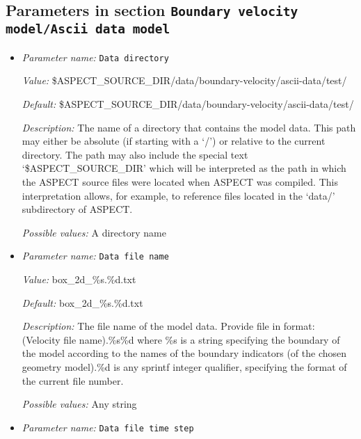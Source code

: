 \subsection{Parameters in section \tt Boundary velocity model/Ascii data model}
\label{parameters:Boundary_20velocity_20model/Ascii_20data_20model}

\begin{itemize}
\item {\it Parameter name:} {\tt Data directory}
\label{parameters:Boundary velocity model/Ascii data model/Data directory}


{\it Value:} \$ASPECT\_SOURCE\_DIR/data/boundary-velocity/ascii-data/test/


{\it Default:} \$ASPECT\_SOURCE\_DIR/data/boundary-velocity/ascii-data/test/


{\it Description:} The name of a directory that contains the model data. This path may either be absolute (if starting with a `/') or relative to the current directory. The path may also include the special text `\$ASPECT\_SOURCE\_DIR' which will be interpreted as the path in which the ASPECT source files were located when ASPECT was compiled. This interpretation allows, for example, to reference files located in the `data/' subdirectory of ASPECT. 


{\it Possible values:} A directory name
\item {\it Parameter name:} {\tt Data file name}
\label{parameters:Boundary velocity model/Ascii data model/Data file name}


{\it Value:} box\_2d\_\%s.\%d.txt


{\it Default:} box\_2d\_\%s.\%d.txt


{\it Description:} The file name of the model data. Provide file in format: (Velocity file name).\%s\%d where \%s is a string specifying the boundary of the model according to the names of the boundary indicators (of the chosen geometry model).\%d is any sprintf integer qualifier, specifying the format of the current file number. 


{\it Possible values:} Any string
\item {\it Parameter name:} {\tt Data file time step}
\label{parameters:Boundary velocity model/Ascii data model/Data file time step}



\end{itemize}
